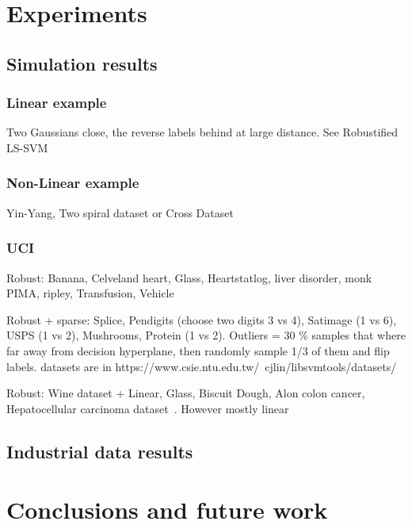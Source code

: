 \documentclass[preprint,12pt]{elsarticle}
\begin{document}
	\section{Experiments} 
	\label{sec:exp}
	\subsection{Simulation results} 
	
	\subsubsection{Linear example}
	
	Two Gaussians close, the reverse labels behind at large distance. See Robustified LS-SVM~\cite{debruyne2009robustified}
	
	\subsubsection{Non-Linear example}
	
	Yin-Yang, Two spiral dataset or Cross Dataset~\cite{yang2014robust}
	
	\subsubsection{UCI}
	
	Robust: Banana, Celveland heart, Glass, Heartstatlog, liver disorder, monk PIMA, ripley, Transfusion, Vehicle~\cite{yang2014robust}
	
	Robust + sparse: Splice, Pendigits (choose two digits 3 vs 4), Satimage (1 vs 6), USPS (1 vs 2), Mushrooms, Protein (1 vs 2).\cite{chen2018sparse}
	Outliers = 30 \% samples that where far away from decision hyperplane, then randomly sample 1/3 of them and flip labels. datasets are in https://www.csie.ntu.edu.tw/~cjlin/libsvmtools/datasets/ 
	
	Robust: Wine dataset + Linear, Glass, Biscuit Dough, Alon colon cancer, Hepatocellular carcinoma dataset~\cite{debruyne2009robustified}. However mostly linear
	
	\subsection{Industrial data results} 
	
	\section{Conclusions and future work}
	\label{sec:conc}
	
\end{document}
